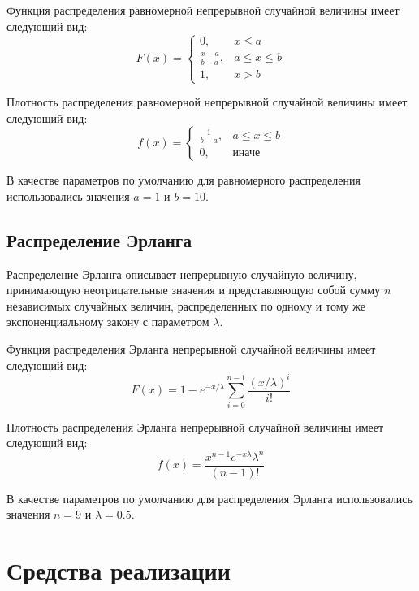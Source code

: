 \documentclass[12pt]{report}
\begin{document}
Функция распределения равномерной непрерывной случайной величины имеет следующий вид:
\begin{equation*}
	F(x) = \begin{cases}
		0, & x \leq a \\
		\frac{x-a}{b-a}, & a \leq x \leq b \\
		1, & x > b
	\end{cases}
\end{equation*}

Плотность распределения равномерной непрерывной случайной величины имеет следующий вид:
\begin{equation*}
	f(x) = \begin{cases}
		\frac{1}{b-a}, & a \leq x \leq b \\
		0, & \text{иначе}
	\end{cases}
\end{equation*}

В качестве параметров по умолчанию для равномерного распределения использовались значения $a = 1$ и $b = 10$.

\subsection*{Распределение Эрланга}
Распределение Эрланга описывает непрерывную случайную величину, принимающую неотрицательные значения и представляющую собой сумму $n$ независимых случайных величин, распределенных по одному и тому же экспоненциальному закону с параметром $\lambda$.
\newline

Функция распределения Эрланга непрерывной случайной величины имеет следующий вид:
\begin{equation*}
	F(x) = 1 - e^{-x/\lambda} \sum_{i=0}^{n-1} \frac{(x/\lambda)^i}{i!} 
\end{equation*}

Плотность распределения Эрланга непрерывной случайной величины имеет следующий вид:
\begin{equation*}
	f(x) = \frac{x^{n-1}e^{-x\lambda}\lambda^n}{(n-1)!}
\end{equation*}

В качестве параметров по умолчанию для распределения Эрланга использовались значения $n = 9$ и $\lambda = 0.5$.

\section*{Средства реализации}
\end{document}
